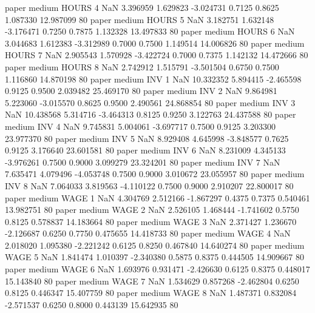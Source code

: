             paper     medium    HOURS                 4                  NaN  3.396959 1.629823 -3.024731 0.7125 0.8625  1.087330   12.987099 80
            paper     medium    HOURS                 5                  NaN  3.182751 1.632148 -3.176471 0.7250 0.7875  1.132328   13.497833 80
            paper     medium    HOURS                 6                  NaN  3.044683 1.612383 -3.312989 0.7000 0.7500  1.149514   14.006826 80
            paper     medium    HOURS                 7                  NaN  2.905543 1.570928 -3.422724 0.7000 0.7375  1.142132   14.472666 80
            paper     medium    HOURS                 8                  NaN  2.742912 1.515791 -3.501504 0.6750 0.7500  1.116860   14.870198 80
            paper     medium      INV                 1                  NaN 10.332352 5.894415 -2.465598 0.9125 0.9500  2.039482   25.469170 80
            paper     medium      INV                 2                  NaN  9.864981 5.223060 -3.015570 0.8625 0.9500  2.490561   24.868854 80
            paper     medium      INV                 3                  NaN 10.438568 5.314716 -3.464313 0.8125 0.9250  3.122763   24.437588 80
            paper     medium      INV                 4                  NaN  9.745831 5.004061 -3.697717 0.7500 0.9125  3.203300   23.977370 80
            paper     medium      INV                 5                  NaN  8.929408 4.645998 -3.848577 0.7625 0.9125  3.176640   23.601581 80
            paper     medium      INV                 6                  NaN  8.231009 4.345133 -3.976261 0.7500 0.9000  3.099279   23.324201 80
            paper     medium      INV                 7                  NaN  7.635471 4.079496 -4.053748 0.7500 0.9000  3.010672   23.055957 80
            paper     medium      INV                 8                  NaN  7.064033 3.819563 -4.110122 0.7500 0.9000  2.910207   22.800017 80
            paper     medium     WAGE                 1                  NaN  4.304769 2.512166 -1.867297 0.4375 0.7375  0.540461   13.982751 80
            paper     medium     WAGE                 2                  NaN  2.526105 1.468444 -1.741602 0.5750 0.8125  0.578837   14.183664 80
            paper     medium     WAGE                 3                  NaN  2.371427 1.236670 -2.126687 0.6250 0.7750  0.475655   14.418733 80
            paper     medium     WAGE                 4                  NaN  2.018020 1.095380 -2.221242 0.6125 0.8250  0.467840   14.640274 80
            paper     medium     WAGE                 5                  NaN  1.841474 1.010397 -2.340380 0.5875 0.8375  0.444505   14.909667 80
            paper     medium     WAGE                 6                  NaN  1.693976 0.931471 -2.426630 0.6125 0.8375  0.448017   15.143840 80
            paper     medium     WAGE                 7                  NaN  1.534629 0.857268 -2.462804 0.6250 0.8125  0.446347   15.407759 80
            paper     medium     WAGE                 8                  NaN  1.487371 0.832084 -2.571537 0.6250 0.8000  0.443139   15.642935 80